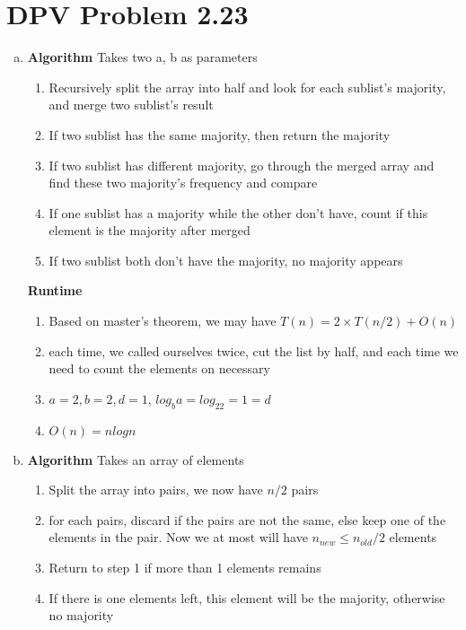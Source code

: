 \documentclass{article}
\def\math#1{$#1$}
\begin{document}
\section{DPV Problem 2.23}
\begin{enumerate}[a)]
    \item 
        \textbf{Algorithm} Takes two a, b as parameters
        \begin{enumerate}
            \item Recursively split the array into half and look for each sublist's majority, and merge two sublist's result
            \item If two sublist has the same majority, then return the majority
            \item If two sublist has different majority, go through the merged array and find these two majority's frequency and compare
            \item If one sublist has a majority while the other don't have, count if this element is the majority after merged
            \item If two sublist both don't have the majority, no majority appears
        \end{enumerate}
        \textbf{Runtime} 
        \begin{enumerate}
            \item Based on master's theorem, we may have \math{T(n) = 2 \times T(n/2) + O(n)}
            \item each time, we called ourselves twice, cut the list by half, and each time we need to count the elements on necessary
            \item \math{a = 2, b = 2, d = 1}, \math{log_ba = log_22 = 1 = d}
            \item \math{O(n) = nlogn}
        \end{enumerate}
    \item 
        \textbf{Algorithm} Takes an array of elements
        \begin{enumerate}[Step 1]
            \item Split the array into pairs, we now have \math{n / 2} pairs
            \item for each pairs, discard if the pairs are not the same, else keep one of the elements in the pair. Now we at most will have \math{n_{new} \leq n_{old} / 2} elements
            \item Return to step 1 if more than 1 elements remains
            \item If there is one elements left, this element will be the majority, otherwise no majority

\end{enumerate}
\end{enumerate}
\end{document}

